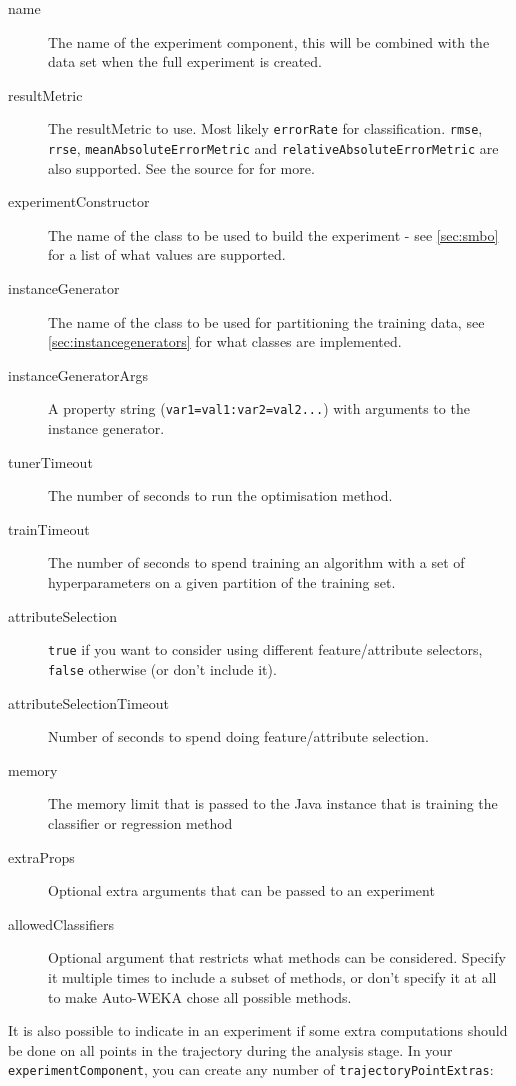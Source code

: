     
\begin{description}
 \item [name] The name of the experiment component, this will be combined with the data set when the full experiment is created.
 \item [resultMetric] The resultMetric to use. Most likely \texttt{errorRate} for classification. \texttt{rmse}, \texttt{rrse}, \texttt{meanAbsoluteErrorMetric} and  \texttt{relativeAbsoluteErrorMetric} are also supported. See the source for  for more.
 \item [experimentConstructor] The name of the class to be used to build the experiment - see \ref{sec:smbo} for a list of what values are supported.
 \item [instanceGenerator] The name of the class to be used for partitioning the training data, see \ref{sec:instancegenerators} for what classes are implemented.
 \item [instanceGeneratorArgs] A property string (\texttt{var1=val1:var2=val2...}) with arguments to the instance generator.
 \item [tunerTimeout] The number of seconds to run the optimisation method.
 \item [trainTimeout] The number of seconds to spend training an algorithm with a set of hyperparameters on a given partition of the training set.
 \item [attributeSelection] \texttt{true} if you want to consider using different feature/attribute selectors, \texttt{false} otherwise (or don't include it).
 \item [attributeSelectionTimeout] Number of seconds to spend doing feature/attribute selection.
 \item [memory] The memory limit that is passed to the Java instance that is training the classifier or regression method
 \item [extraProps] Optional extra arguments that can be passed to an experiment
 \item [allowedClassifiers] Optional argument that restricts what methods can be considered. Specify it multiple times to include a subset of methods, or don't specify it at all to make Auto-WEKA chose all possible methods.  
\end{description}

It is also possible to indicate in an experiment if some extra computations should be done on all points in the trajectory during the analysis stage. In your \texttt{experimentComponent}, you can create any number of \texttt{trajectoryPointExtras}:

